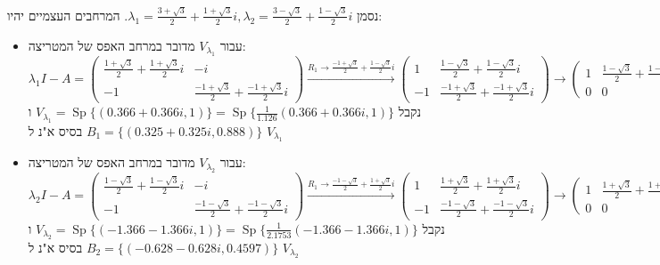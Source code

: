 \documentclass{article}
\DeclareMathOperator{\Sp}{Sp}
\begin{document}
נסמן $\lambda_1=\frac{3+\sqrt{3}}{2}+\frac{1+\sqrt{3}}{2}i, \lambda_2=\frac{3-\sqrt{3}}{2}+\frac{1-\sqrt{3}}{2}i$. המרחבים העצמיים יהיו:
\begin{itemize}
    \item עבור $V_{\lambda_1}$ מדובר במרחב האפס של המטריצה: \\
          \[
              \lambda_1I-A=\begin{pmatrix}
                  \frac{1+\sqrt{3}}{2}+\frac{1+\sqrt{3}}{2}i & -i                                           \\
                  -1                                         & \frac{-1+\sqrt{3}}{2}+\frac{-1+\sqrt{3}}{2}i
              \end{pmatrix}\xrightarrow{R_1\rightarrow \frac{-1+\sqrt{3}}{2}+\frac{1-\sqrt{3}}{2}i}
              \begin{pmatrix}
                  1  & \frac{1-\sqrt{3}}{2} + \frac{1-\sqrt{3}}{2}i \\
                  -1 & \frac{-1+\sqrt{3}}{2}+\frac{-1+\sqrt{3}}{2}i
              \end{pmatrix}
              \rightarrow
              \begin{pmatrix}
                  1 & \frac{1-\sqrt{3}}{2} + \frac{1-\sqrt{3}}{2}i \\
                  0 & 0
              \end{pmatrix}
          \]
          נקבל $V_{\lambda_1}=\Sp\{ (0.366 + 0.366i, 1) \}=\Sp\{ \frac{1}{1.126}(0.366 + 0.366i, 1) \}$ ו$B_1=\{(0.325+0.325i, 0.888)\}$ בסיס א"נ ל $V_{\lambda_1}$
    \item עבור $V_{\lambda_2}$ מדובר במרחב האפס של המטריצה: \\
          \[
              \lambda_2I-A=\begin{pmatrix}
                  \frac{1-\sqrt{3}}{2}+\frac{1-\sqrt{3}}{2}i & -i                                           \\
                  -1                                         & \frac{-1-\sqrt{3}}{2}+\frac{-1-\sqrt{3}}{2}i
              \end{pmatrix}\xrightarrow{R_1\rightarrow \frac{-1-\sqrt{3}}{2}+\frac{1+\sqrt{3}}{2}i}
              \begin{pmatrix}
                  1  & \frac{1+\sqrt{3}}{2} + \frac{1+\sqrt{3}}{2}i \\
                  -1 & \frac{-1-\sqrt{3}}{2}+\frac{-1-\sqrt{3}}{2}i
              \end{pmatrix}
              \rightarrow
              \begin{pmatrix}
                  1 & \frac{1+\sqrt{3}}{2} + \frac{1+\sqrt{3}}{2}i \\
                  0 & 0
              \end{pmatrix}
          \]
          נקבל $V_{\lambda_2}=\Sp\{ (-1.366 -1.366i, 1) \}=\Sp\{ \frac{1}{2.1753}(-1.366 -1.366i, 1) \}$ ו$B_2=\{(-0.628-0.628i, 0.4597)\}$ בסיס א"נ ל $V_{\lambda_2}$
\end{itemize}
\end{document}
